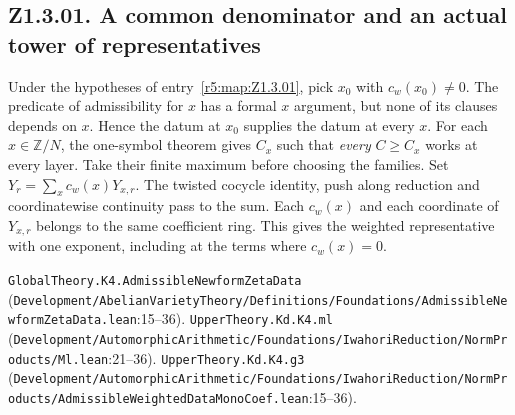 \subsection{Z1.3.01. A common denominator and an actual tower of representatives}\label{r6:Z1.3.01}
Under the hypotheses of entry~\ref{r5:map:Z1.3.01}, pick $x_0$ with $c_w(x_0)\ne0$. The predicate of admissibility for $x$ has a formal $x$ argument, but none of its clauses depends on $x$. Hence the datum at $x_0$ supplies the datum at every $x$. For each $x\in\mathbb Z/N$, the one-symbol theorem gives $C_x$ such that \emph{every} $C\ge C_x$ works at every layer. Take their finite maximum before choosing the families. Set $Y_r=\sum_x c_w(x)Y_{x,r}$. The twisted cocycle identity, push along reduction and coordinatewise continuity pass to the sum. Each $c_w(x)$ and each coordinate of $Y_{x,r}$ belongs to the same coefficient ring. This gives the weighted representative with one exponent, including at the terms where $c_w(x)=0$.
\par{\footnotesize \nolinkurl{GlobalTheory.K4.AdmissibleNewformZetaData} (\nolinkurl{Development/AbelianVarietyTheory/Definitions/Foundations/AdmissibleNewformZetaData.lean}\allowbreak:15--36). \nolinkurl{UpperTheory.Kd.K4.ml} (\nolinkurl{Development/AutomorphicArithmetic/Foundations/IwahoriReduction/NormProducts/Ml.lean}\allowbreak:21--36). \nolinkurl{UpperTheory.Kd.K4.g3} (\nolinkurl{Development/AutomorphicArithmetic/Foundations/IwahoriReduction/NormProducts/AdmissibleWeightedDataMonoCoef.lean}\allowbreak:15--36).\par}

